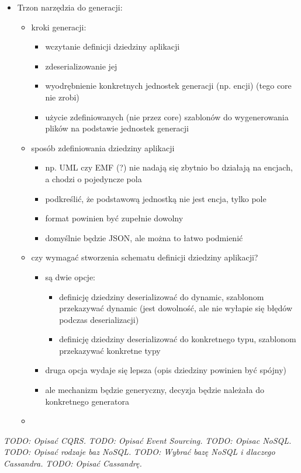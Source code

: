 \begin{itemize}
 \item Trzon narzędzia do generacji:
  \begin{itemize}
   \item kroki generacji:
    \begin{itemize}
     \item wczytanie definicji dziedziny aplikacji
     \item zdeserializowanie jej
     \item wyodrębnienie konkretnych jednostek generacji (np. encji) (tego core nie zrobi)
     \item użycie zdefiniowanych (nie przez core) szablonów do wygenerowania plików na podstawie jednostek generacji
    \end{itemize}
   \item sposób zdefiniowania dziedziny aplikacji
    \begin{itemize}
     \item np. UML czy EMF (?) nie nadają się zbytnio bo działają na encjach, a chodzi o pojedyncze pola
     \item podkreślić, że podstawową jednostką nie jest encja, tylko pole
     \item format powinien być zupełnie dowolny
     \item domyślnie będzie JSON, ale można to łatwo podmienić
    \end{itemize}
   \item czy wymagać stworzenia schematu definicji dziedziny aplikacji?
    \begin{itemize}
     \item są dwie opcje:
      \begin{itemize}
       \item definicję dziedziny deserializować do dynamic, szablonom przekazywać dynamic (jest dowolność, ale nie wyłapie się błędów podczas deserializacji)
       \item definicję dziedziny deserializować do konkretnego typu, szablonom przekazywać konkretne typy
      \end{itemize}
     \item druga opcja wydaje się lepsza (opis dziedziny powinien być spójny)
     \item ale mechanizm będzie generyczny, decyzja będzie należała do konkretnego generatora
    \end{itemize}

   
   \item 
  \end{itemize}

\end{itemize}


\emph{TODO: Opisać CQRS.}
\emph{TODO: Opisać Event Sourcing.}
\emph{TODO: Opisac NoSQL.}
\emph{TODO: Opisać rodzaje baz NoSQL.}
\emph{TODO: Wybrać bazę NoSQL i dlaczego Cassandra.}
\emph{TODO: Opisać Cassandrę.}